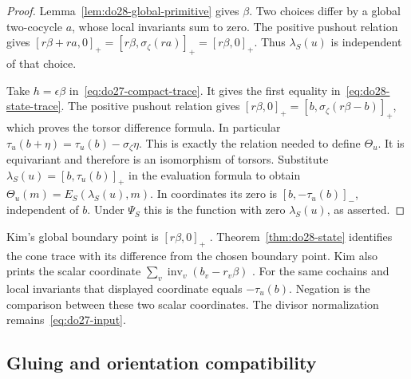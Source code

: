 \begin{proof}
Lemma~\ref{lem:do28-global-primitive} gives \(\beta\).
Two choices differ by a global two-cocycle \(a\), whose local
invariants sum to zero. The positive pushout relation gives
\([r\beta+r a,0]_+=[r\beta,\sigma_\zeta(r a)]_+=[r\beta,0]_+\).
Thus \(\lambda_S(u)\) is independent of that choice.

Take \(h=\epsilon\beta\) in~\eqref{eq:do27-compact-trace}.
It gives the first equality in~\eqref{eq:do28-state-trace}.
The positive pushout relation gives
\([r\beta,0]_+=[b,\sigma_\zeta(r\beta-b)]_+\), which proves
the torsor difference formula. In particular
\(\tau_u(b+\eta)=\tau_u(b)-\sigma_\zeta\eta\).
This is exactly the relation needed to define \(\Theta_u\).
It is equivariant and therefore is an isomorphism of torsors.
Substitute \(\lambda_S(u)=[b,\tau_u(b)]_+\) in the evaluation
formula to obtain \(\Theta_u(m)=E_S(\lambda_S(u),m)\).
In coordinates its zero is \([b,-\tau_u(b)]_-\), independent of
\(b\). Under \(\Psi_S\) this is the function with zero
\(\lambda_S(u)\), as asserted.
\end{proof}

Kim's global boundary point is \([r\beta,0]_+\)
\cite[\S2, p.~6, the displayed definition of \(\operatorname{CS}_c\)]{Kim2016}.
Theorem~\ref{thm:do28-state} identifies the cone trace with its
difference from the chosen boundary point. Kim also prints the scalar
coordinate \(\sum_v\operatorname{inv}_v(b_v-r_v\beta)\)
\cite[\S5, p.~12]{Kim2016}. For the same cochains and local
invariants that displayed coordinate equals \(-\tau_u(b)\).
Negation is the comparison between these two scalar coordinates.
The divisor normalization remains~\eqref{eq:do27-input}.

\subsection{Gluing and orientation compatibility}
\label{sec:do28-gluing}

